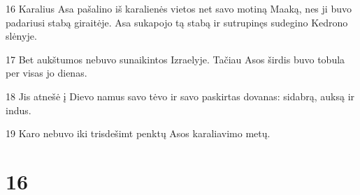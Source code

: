 \par 16 Karalius Asa pašalino iš karalienės vietos net savo motiną Maaką, nes ji buvo padariusi stabą giraitėje. Asa sukapojo tą stabą ir sutrupinęs sudegino Kedrono slėnyje. 
\par 17 Bet aukštumos nebuvo sunaikintos Izraelyje. Tačiau Asos širdis buvo tobula per visas jo dienas. 
\par 18 Jis atnešė į Dievo namus savo tėvo ir savo paskirtas dovanas: sidabrą, auksą ir indus. 
\par 19 Karo nebuvo iki trisdešimt penktų Asos karaliavimo metų.



\chapter{16}


